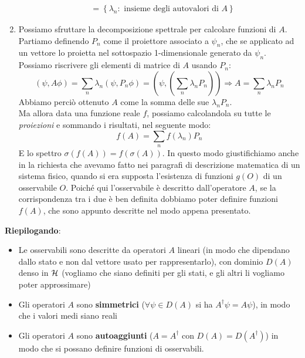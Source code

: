 \begin{enumerate}
\begin{align*}
	    &=\left\{\lambda_n:\text{ insieme degli autovalori di } A\right\}
	\end{align*}
\item Possiamo sfruttare la decomposizione spettrale per calcolare funzioni di $A$.\\
Partiamo definendo $P_n$ come il proiettore associato a $\psi_n$, che se applicato ad un vettore lo proietta nel sottospazio 1-dimensionale generato da $\psi_n$. Possiamo riscrivere gli elementi di matrice di $A$ usando $P_n$:
	\[
	\left(\psi, A\phi\right)=\sum_{n}{\lambda_n\left(\psi,P_n\phi\right)}=\left(\psi, \left(\sum_{n}{\lambda_n P_n}\right)\right) \Rightarrow A=\sum_{n}{\lambda_n P_n}
	\]
	Abbiamo perciò ottenuto $A$ come la somma delle sue  $\lambda_n P_n$.\\
	Ma allora data una funzione reale $f$, possiamo 
	calcolandola su tutte le \textit{proiezioni} e sommando i risultati, nel seguente modo:
	\begin{equation}
	f\left(A\right)=\sum_{n}{f\left(\lambda_n\right)P_n}
	\label{eqn:funzioniop}
	\end{equation}
	E lo spettro $\sigma \left(f\left(A\right)\right)=f(\sigma \left(A\right))$. 
	In questo modo giustifichiamo anche in \MQ la richiesta che avevamo fatto nei paragrafi di descrizione matematica di un sistema fisico, quando si era supposta l'esistenza di funzioni $g(O)$ di un osservabile $O$. Poiché qui l'osservabile è descritto dall'operatore $A$, se la corrispondenza tra i due è ben definita dobbiamo poter definire funzioni $f(A)$, che sono appunto descritte nel modo appena presentato.
\end{enumerate}

\textbf{Riepilogando}:
\begin{itemize}
    \item Le osservabili sono descritte da operatori $A$ lineari (in modo che dipendano dallo stato e non dal vettore usato per rappresentarlo), con dominio $D(A)$ denso in $\mathcal{H}$ (vogliamo che siano definiti per  gli stati, e gli altri li vogliamo poter approssimare) %
    \item Gli operatori $A$ sono \textbf{simmetrici} ($\forall \psi \in D(A)$ si ha $A^\dag \psi = A\psi$), in modo che i valori medi siano reali
    \item Gli operatori $A$ sono \textbf{autoaggiunti} ($A = A^\dag$ con $D(A) = D(A^\dag)$) in modo che si possano definire funzioni di osservabili.
\end{itemize}

